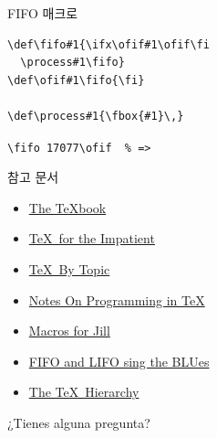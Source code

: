 \documentclass{beamer}
\begin{document}
\begin{frame}[fragile]{FIFO 매크로}
\begin{verbatim}
\def\fifo#1{\ifx\ofif#1\ofif\fi
  \process#1\fifo}
\def\ofif#1\fifo{\fi}

\def\process#1{\fbox{#1}\,}
\end{verbatim}

\verb+\fifo 17077\ofif  % =>+ \quad {}\ofif
\end{frame}


%
\begin{frame}{참고 문서}
  \begin{itemize}
  \item \href{http://ftp.ktug.org/tex-archive/systems/knuth/dist/tex/}
    {The \TeX book}
  \item \href{http://ftp.ktug.org/tex-archive/info/impatient/book.pdf}
    {\TeX\ for the Impatient}
  \item \href{http://ftp.ktug.org/tex-archive/info/texbytopic/TeXbyTopic.pdf}
    {\TeX\ By Topic}
  \item \href{http://pgfplots.sourceforge.net/TeX-programming-notes.pdf}
    {Notes On Programming in TeX}
  \item \href{https://www.tug.org/TUGboat/tb08-3/tb19knut.pdf}
    {Macros for Jill}
  \item \href{https://www.tug.org/TUGboat/tb14-1/tb38laan.pdf}
    {FIFO and LIFO sing the BLUes}
  \item \href{https://www.tug.org/TUGboat/tb15-1/tb42arseneau.pdf}
    {The TeX\ Hierarchy}
  \end{itemize}
\end{frame}


%
\begin{frame}[standout]
  ¿Tienes alguna pregunta?
\end{frame}
\end{document}
